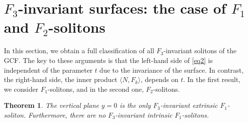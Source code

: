 \documentclass[a4paper,12pt]{amsart}
\theoremstyle{plain}
\newtheorem{theorem}{Theorem}[section]
\theoremstyle{definition}
\begin{document}
\section{$F_3$-invariant surfaces: the case of $F_1$ and $F_2$-solitons}\label{s4}

In this section, we obtain a full classification of all $F_3$-invariant solitons of the GCF. The key to these arguments is that the left-hand side of \eqref{eq2} is independent of the parameter $t$ due to the invariance of the surface. In contrast, the right-hand side, the inner product $\langle N,F_k\rangle$, depends on $t$. In the first result, we consider $F_1$-solitons, and in the second one, $F_2$-solitons.



\begin{theorem}\label{t41}
The vertical plane $y=0$ is the only $F_3$-invariant extrinsic $F_1$-soliton. Furthermore, there are no $F_3$-invariant intrinsic $F_1$-solitons.
\end{theorem}
\end{document}

